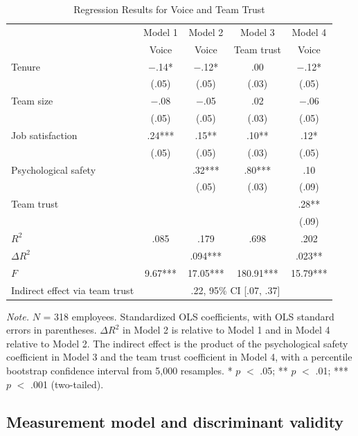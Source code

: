 \documentclass[11pt]{article}
\begin{document}
\begin{table}[ht]
\centering
\begin{threeparttable}
\caption{Regression Results for Voice and Team Trust}
\small
\begin{tabular}{lcccc}
\toprule
 & Model 1 & Model 2 & Model 3 & Model 4 \\
 & Voice & Voice & Team trust & Voice \\
\midrule
Tenure & $-$.14* & $-$.12* & .00 & $-$.12* \\
 & (.05) & (.05) & (.03) & (.05) \\
Team size & $-$.08 & $-$.05 & .02 & $-$.06 \\
 & (.05) & (.05) & (.03) & (.05) \\
Job satisfaction & .24*** & .15** & .10** & .12* \\
 & (.05) & (.05) & (.03) & (.05) \\
Psychological safety & & .32*** & .80*** & .10 \\
 & & (.05) & (.03) & (.09) \\
Team trust & & & & .28** \\
 & & & & (.09) \\
\midrule
$R^2$ & .085 & .179 & .698 & .202 \\
$\Delta R^2$ & & .094*** & & .023** \\
$F$ & 9.67*** & 17.05*** & 180.91*** & 15.79*** \\
\midrule
Indirect effect via team trust & \multicolumn{4}{c}{.22, 95\% CI [.07, .37]} \\
\bottomrule
\end{tabular}
\begin{tablenotes}\footnotesize
\item \textit{Note.} $N$ = 318 employees. Standardized OLS coefficients, with OLS standard errors in parentheses. $\Delta R^2$ in Model 2 is relative to Model 1 and in Model 4 relative to Model 2. The indirect effect is the product of the psychological safety coefficient in Model 3 and the team trust coefficient in Model 4, with a percentile bootstrap confidence interval from 5,000 resamples. * $p$ $<$ .05; ** $p$ $<$ .01; *** $p$ $<$ .001 (two-tailed).
\end{tablenotes}
\end{threeparttable}
\end{table}

\subsection{Measurement model and discriminant validity}
\end{document}
